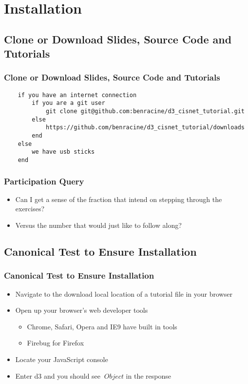 \documentclass{beamer}
\begin{document}
\section{Installation}

\subsection{Clone or Download Slides, Source Code and Tutorials}

\begin{frame}[fragile]
    \frametitle{Clone or Download Slides, Source Code and Tutorials}
        \tiny{
        \begin{verbatim}
    if you have an internet connection
        if you are a git user
            git clone git@github.com:benracine/d3_cisnet_tutorial.git
        else
            https://github.com/benracine/d3_cisnet_tutorial/downloads
        end
    else
        we have usb sticks
    end
        \end{verbatim}
        }
\end{frame}



\begin{frame}[fragile]
    \frametitle{Participation Query}
    \begin{itemize}
    \item Can I get a sense of the fraction that intend on stepping through the exercises?
    \item Versus the number that would just like to follow along?
    \end{itemize}
\end{frame}


\subsection{Canonical Test to Ensure Installation}

\begin{frame}
    \frametitle{Canonical Test to Ensure Installation}
    \begin{itemize}
\pause
    \item Navigate to the download local location of a tutorial file in your browser
\pause
    \item Open up your browser's web developer tools
        \begin{itemize}
        \item Chrome, Safari, Opera and IE9 have built in tools
        \item Firebug for Firefox
        \end{itemize}
\pause
    \item Locate your JavaScript console
\pause
    \item Enter d3 and you should see $\> Object $ in the response
\pause
    \end{itemize}
\end{frame}
\end{document}
